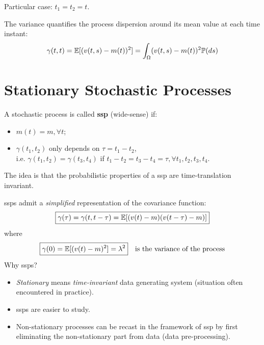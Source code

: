Particular case: $t_{1}=t_{2}=t$.
\begin{definition}[Variance]
	The variance quantifies the process dispersion around its mean value at each time instant:
	\[
		\gamma(t, t)=\mathbb{E}[(v(t, s)-m(t))^{2}]=\int_{\Omega}(v(t, s)-m(t))^{2} \mathbb{P}(ds)
	\]
\end{definition}

\section{Stationary Stochastic Processes}
\begin{definition}
	A stochastic process is called \textbf{\gls{ssp}} (wide-sense) if:
	\begin{itemize}
		\item $m(t)=m, \forall t$;
		\item $\gamma(t_{1}, t_{2})$ only depends on $\tau=t_{1}-t_{2}$,\\
		i.e. $\gamma(t_{1}, t_{2})=\gamma(t_{3}, t_{4})$ if $t_{1}-t_{2}=t_{3}-t_{4}=\tau, \forall t_{1}, t_{2}, t_{3}, t_{4}$.
	\end{itemize}
\end{definition}
The idea is that the probabilistic properties of a \gls{ssp} are time-translation invariant.

\glspl{ssp} admit a \emph{simplified} representation of the covariance function:
\[
	\boxed{\gamma(\tau)=\gamma(t, t-\tau)=\mathbb{E}[(v(t)-m)(v(t-\tau)-m)]}
\]
where
\[
	\boxed{\gamma(0)=\mathbb{E}[(v(t)-m)^{2}]=\lambda^2} \quad \text{is the variance of the process}
\]
Why \glspl{ssp}?
\begin{itemize}
	\item \emph{Stationary} means \emph{time-invariant} data generating system (situation often encountered in practice).
	\item \glspl{ssp} are easier to study.
	\item Non-stationary processes can be recast in the framework of \gls{ssp} by first eliminating the non-stationary part from data (data pre-processing).
\end{itemize}

